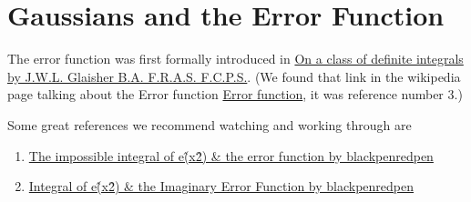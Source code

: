 \section{Gaussians and the Error Function}

The error function was first formally introduced in
\href{https://books.google.com/books?id=8Po7AQAAMAAJ&pg=RA1-PA294#v=onepage&q&f=false}{On a class of definite integrals by J.W.L. Glaisher B.A. F.R.A.S. F.C.P.S.}.
(We found that link in the wikipedia page talking about the Error function
\href{https://en.wikipedia.org/wiki/Error_function}{Error function}, it was reference number 3.)

Some great references we recommend watching and working through are
\begin{enumerate}
\item \href{https://www.youtube.com/watch?v=jkytxdedxhU}{The impossible integral of e\^ (x\^ 2) \& the error function by blackpenredpen}
\item \href{https://www.youtube.com/watch?v=zorcLisjRUI}{Integral of e\^(x\^2) \& the Imaginary Error Function by blackpenredpen}
\end{enumerate}